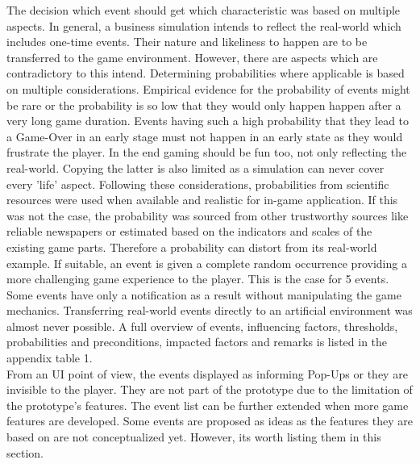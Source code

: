 \documentclass[11pt,titlepage,oneside,openany]{book}
\begin{document}
The decision which event should get which characteristic was based on multiple aspects. In general, a business simulation intends to reflect the real-world which includes one-time events. Their nature and likeliness to happen are to be transferred to the game environment. However, there are aspects which are contradictory to this intend.
Determining probabilities where applicable is based on multiple considerations. Empirical evidence for the probability of events might be rare or the probability is so low that they would only happen happen after a very long game duration. Events having such a high probability that they lead to a Game-Over in an early stage must not happen in an early state as they would frustrate the player. In the end gaming should be fun too, not only reflecting the real-world. Copying the latter is also limited as a simulation can never cover every 'life' aspect.  Following these considerations, probabilities from scientific resources were used when available and realistic for in-game application. If this was not the case, the probability was sourced from other trustworthy sources like reliable newspapers or estimated based on the indicators and scales of the existing game parts. Therefore a probability can distort from its real-world example. If suitable, an event is given a complete random occurrence providing a more challenging game experience to the player. This is the case for 5 events. Some events have only a notification as a result without manipulating the game mechanics. Transferring real-world events directly to an artificial environment was almost never possible. A full overview of events, influencing factors, thresholds, probabilities and preconditions, impacted factors and remarks is listed in the appendix table 1. \\
From an UI point of view, the events displayed as informing Pop-Ups or they are invisible to the player. They are not part of the prototype due to the limitation of the prototype's features. The event list can be further extended when more game features are developed. Some events are proposed as ideas as the features they are based on are not conceptualized yet. However, its worth listing them in this section. 
\end{document}
